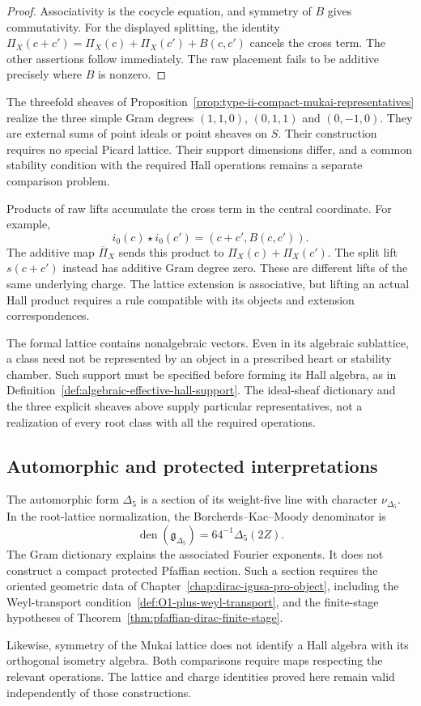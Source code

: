 \begin{proof}
Associativity is the cocycle equation, and symmetry of $B$ gives
commutativity.  For the displayed splitting, the identity
$\Pi_X(c+c')=\Pi_X(c)+\Pi_X(c')+B(c,c')$ cancels the cross term.
The other assertions follow immediately.  The raw placement fails
to be additive precisely where $B$ is nonzero.
\end{proof}

The threefold sheaves of
Proposition~\ref{prop:type-ii-compact-mukai-representatives} realize
the three simple Gram degrees $(1,1,0)$, $(0,1,1)$ and $(0,-1,0)$.
They are external sums of point ideals or point sheaves on $S$.
Their construction requires no special Picard lattice.  Their support dimensions differ,
and a common stability condition with the required Hall operations
remains a separate comparison problem.

\begin{remark}
\label{rem:resolution-polarization-defect-appendixC}
Products of raw lifts accumulate the cross term in the central
coordinate.  For example,
\[
i_0(c)\star i_0(c')=(c+c',B(c,c')).
\]
The additive map $\overline\Pi_X$ sends this product to
$\Pi_X(c)+\Pi_X(c')$.  The split lift $s(c+c')$ instead has additive
Gram degree zero.  These are different lifts of the same underlying
charge.  The lattice extension is associative, but lifting an
actual Hall product requires a rule compatible with its objects
and extension correspondences.
\end{remark}

\begin{remark}
\label{rem:chart-data-not-hall-support-appendixC}
The formal lattice contains nonalgebraic vectors.  Even in its
algebraic sublattice, a class need not be represented by an object
in a prescribed heart or stability chamber.  Such support must be
specified before forming its Hall algebra, as in
Definition~\ref{def:algebraic-effective-hall-support}.  The
ideal-sheaf dictionary and the three explicit sheaves above supply
particular representatives, not a realization of every root class
with all the required operations.
\end{remark}

\subsection{Automorphic and protected interpretations}
\label{subsec:three-igusa-names-chart-data}

The automorphic form $\Delta_5$ is a section of its weight-five line
with character $\nu_{\Delta_5}$.  In the root-lattice normalization,
the Borcherds--Kac--Moody denominator is
\[
\operatorname{den}(\mathfrak g_{\Delta_5})
=64^{-1}\Delta_5(2Z).
\]
The Gram dictionary explains the associated Fourier exponents.
It does not construct a compact protected Pfaffian section.  Such a
section requires the oriented geometric data of
Chapter~\ref{chap:dirac-igusa-pro-object}, including the
Weyl-transport condition~\ref{def:O1-plus-weyl-transport}, and the
finite-stage hypotheses of
Theorem~\ref{thm:pfaffian-dirac-finite-stage}.

Likewise, symmetry of the Mukai lattice does not identify a Hall
algebra with its orthogonal isometry algebra.  Both comparisons
require maps respecting the relevant operations.  The lattice and
charge identities proved here remain valid independently of those
constructions.
